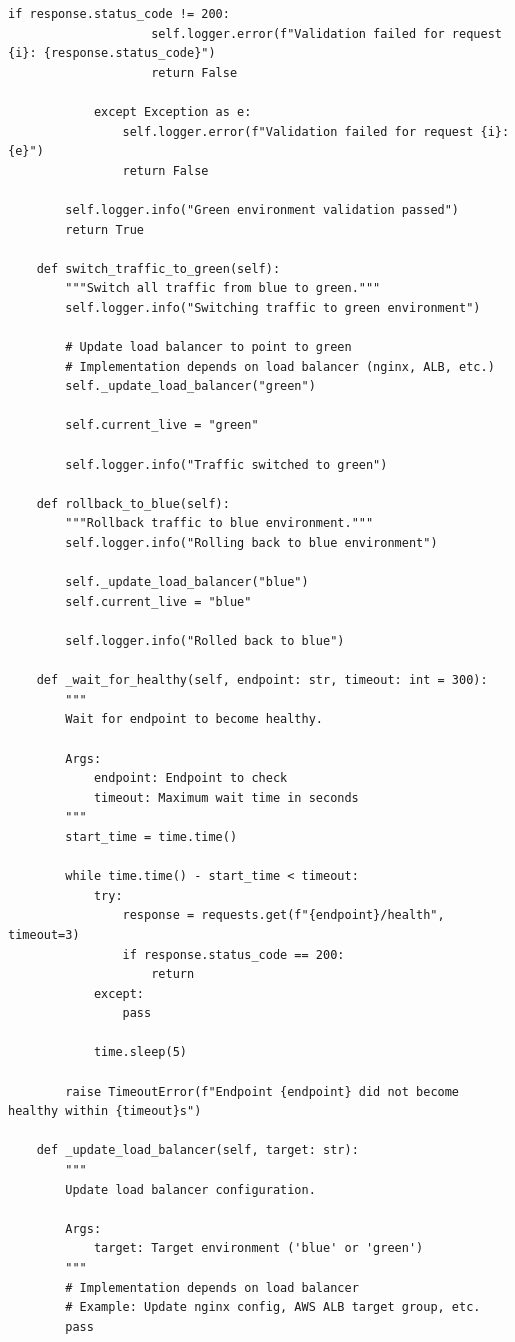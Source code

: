 \begin{lstlisting}[style=python, caption={Blue-Green Deployment Controller}]
                if response.status_code != 200:
                    self.logger.error(f"Validation failed for request {i}: {response.status_code}")
                    return False

            except Exception as e:
                self.logger.error(f"Validation failed for request {i}: {e}")
                return False

        self.logger.info("Green environment validation passed")
        return True

    def switch_traffic_to_green(self):
        """Switch all traffic from blue to green."""
        self.logger.info("Switching traffic to green environment")

        # Update load balancer to point to green
        # Implementation depends on load balancer (nginx, ALB, etc.)
        self._update_load_balancer("green")

        self.current_live = "green"

        self.logger.info("Traffic switched to green")

    def rollback_to_blue(self):
        """Rollback traffic to blue environment."""
        self.logger.info("Rolling back to blue environment")

        self._update_load_balancer("blue")
        self.current_live = "blue"

        self.logger.info("Rolled back to blue")

    def _wait_for_healthy(self, endpoint: str, timeout: int = 300):
        """
        Wait for endpoint to become healthy.

        Args:
            endpoint: Endpoint to check
            timeout: Maximum wait time in seconds
        """
        start_time = time.time()

        while time.time() - start_time < timeout:
            try:
                response = requests.get(f"{endpoint}/health", timeout=3)
                if response.status_code == 200:
                    return
            except:
                pass

            time.sleep(5)

        raise TimeoutError(f"Endpoint {endpoint} did not become healthy within {timeout}s")

    def _update_load_balancer(self, target: str):
        """
        Update load balancer configuration.

        Args:
            target: Target environment ('blue' or 'green')
        """
        # Implementation depends on load balancer
        # Example: Update nginx config, AWS ALB target group, etc.
        pass


\end{lstlisting}
